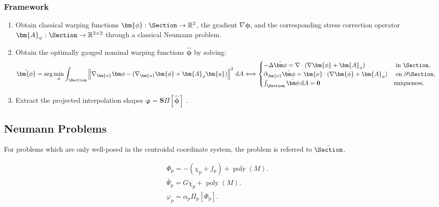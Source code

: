 \subsubsection{Framework}

\begin{enumerate}
    \item Obtain classical warping functions \(\bm{\phi}:\Section\rightarrow\mathbb{R}^2\), the gradient \(\nabla \bm{\phi}\), and the corresponding stress correction operator \(\bm{A}_{\psi}:\Section\rightarrow\mathbb{R}^{2\times 2}\) through a classical Neumann problem.
    \item Obtain the optimally gauged nominal warping functions \(\hat{\bm{\phi}}\) by solving:
    \begin{equation}
    \hat{\bm{\phi}}=\arg \min _\phi \int_{\Section}\left\|\nabla_{\bm{u}} { \bm \phi}-(\nabla_{\bm{u}} \bm{\phi} + \bm{A}_{\phi}\bm{u})\right\|^2 \,\mathrm{d} A \Longleftrightarrow 
    \begin{cases}
    -\Delta \hat{\bm \phi}=\nabla \cdot (\nabla \bm{\phi} + \bm{A}_{\phi}) & \text { in } \Section, \\ 
    \partial_{\bm{\nu}} \hat{\bm\phi}=\bm{\nu} \cdot (\nabla \bm{\phi} + \bm{A}_{\phi}) & \text { on } \partial \Section, \\ 
    \int_{\Section} \hat{\bm \phi}\, \mathrm{d} A=\mathbf{0} & \text {uniqueness. }
    \end{cases}
    \end{equation}
    \item Extract the projected interpolation shapes \(\bm{\varphi} = \bm{S}\Pi[\hat{\bm{\phi}}]\) \citep{simo1982bifurcation}.
\end{enumerate}


\subsection{Neumann Problems}
For problems which are only well-posed in the centroidal coordinate system, the problem is referred to \(\bar{\Section}\).

\begin{equation}
\begin{aligned}
& \Phi_{\mathrm{p}}=-\left(\chi_{\mathrm{p}}+f_{\mathrm{p}}\right)+\operatorname{poly}(M) . \\
& \bar{\Psi}_{\mathrm{p}}=G \chi_{\mathrm{p}}+\operatorname{poly}(M) . \\
& \varphi_{\mathrm{p}}=\alpha_{\mathrm{p}} \Pi_{\mathrm{p}}\left[\Phi_{\mathrm{p}}\right] .
\end{aligned}
\end{equation}



